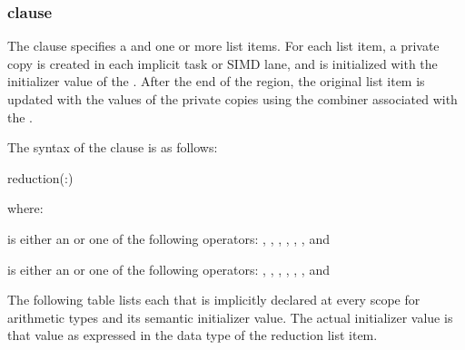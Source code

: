 \subsubsection{ clause}
\label{subsubsec:reduction clause}
\summary
The  clause specifies a  and one or more list items. For 
each list item, a private copy is created in each implicit task or SIMD lane, and is 
initialized with the initializer value of the . After the end of the 
region, the original list item is updated with the values of the private copies using the 
combiner associated with the .

\syntax
\ccppspecificstart %
The syntax of the  clause is as follows:

\begin{boxedcode}
reduction(:)
\end{boxedcode}

where:

\cspecificstart %
 is either an  or one of the following operators:
\code{+},
\code{-},
\code{*}, 
\code{\&},
\code{|},
\code{\^},
\code{\&\&} and
\code{||}
\cspecificend %

\cppspecificstart %
 is either an  or one of the following operators:
\code{+},
\code{-},
\code{*}, 
\code{\&},
\code{|},
\code{\^},
\code{\&\&} and
\code{||}
\cppspecificend %

The following table lists each  that is implicitly declared at every 
scope for arithmetic types and its semantic initializer value. The actual initializer value 
is that value as expressed in the data type of the reduction list item.

